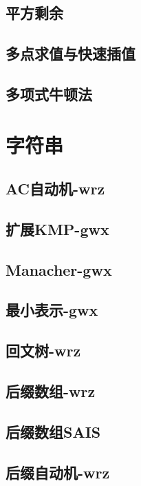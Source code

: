 \documentclass[titlepage,a4paper,10pt]{article}
\begin{document}
\begin{multicols}{2}
\begin{spacing}{0.8}
			\subsection{平方剩余}
				
			\subsection{多点求值与快速插值}
				
			\subsection{多项式牛顿法}
				
		\section{字符串}
			\subsection{AC自动机-wrz}
				
			\subsection{扩展KMP-gwx}
				
			\subsection{Manacher-gwx}
				
			\subsection{最小表示-gwx}
				
			\subsection{回文树-wrz}
				
			\subsection{后缀数组-wrz}
				
			\subsection{后缀数组SAIS}
				
			\subsection{后缀自动机-wrz}
				

\end{spacing}
\end{multicols}
\end{document}
